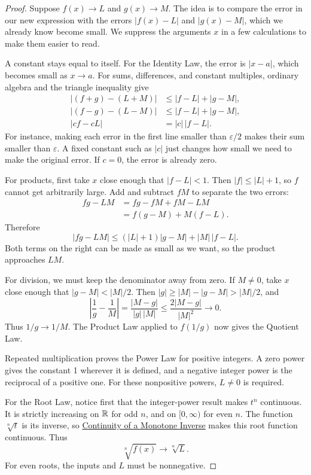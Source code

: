 \begin{proof}
Suppose $f(x)\to L$ and $g(x)\to M$. The idea is to compare the error in
our new expression with the errors $|f(x)-L|$ and $|g(x)-M|$, which we
already know become small. We suppress the arguments $x$ in a few
calculations to make them easier to read.

A constant stays equal to itself. For the Identity Law, the error is
$|x-a|$, which becomes small as $x\to a$. For sums, differences, and
constant multiples, ordinary algebra and the triangle inequality give
\begin{align*}
|(f+g)-(L+M)|&\leq |f-L|+|g-M|,\\
|(f-g)-(L-M)|&\leq |f-L|+|g-M|,\\
|cf-cL|&=|c|\,|f-L|.
\end{align*}
For instance, making each error in the first line smaller than
$\varepsilon/2$ makes their sum smaller than $\varepsilon$.
A fixed constant such as $|c|$ just changes how small we need to make
the original error. If $c=0$, the error is already zero.

For products, first take $x$ close enough that $|f-L|<1$.
Then $|f|\leq |L|+1$, so $f$ cannot get arbitrarily large.
Add and subtract $fM$ to separate the two errors:
\begin{align*}
fg-LM&=fg-fM+fM-LM\\
&=f(g-M)+M(f-L).
\end{align*}
Therefore
$$|fg-LM|\leq (|L|+1)|g-M|+|M|\,|f-L|.$$
Both terms on the right can be made as small as we want, so the
product approaches $LM$.

For division, we must keep the denominator away from zero.
If $M\ne0$, take $x$ close enough that $|g-M|<|M|/2$. Then
$|g|\geq |M|-|g-M|>|M|/2$, and
$$
\left|\frac1g-\frac1M\right|
=\frac{|M-g|}{|g|\,|M|}
\leq\frac{2|M-g|}{|M|^2}\longrightarrow0.
$$
Thus $1/g\to1/M$. The Product Law applied to $f(1/g)$ now gives the
Quotient Law.

Repeated multiplication proves the Power Law for positive integers.
A zero power gives the constant 1 wherever it is defined, and a
negative integer power is the reciprocal of a positive one. For these
nonpositive powers, $L\ne0$ is required.

For the Root Law, notice first that the integer-power result makes
$t^n$ continuous. It is strictly increasing on $\mathbb{R}$ for odd $n$, and
on $[0,\infty)$ for even $n$. The function $\sqrt[n]{t}$ is its inverse,
so \hyperref[sec:inverse-continuity-proof]{Continuity of a Monotone Inverse}
makes this root function continuous. Thus
$$\sqrt[n]{f(x)}\longrightarrow\sqrt[n]{L}.$$
For even roots, the inputs and $L$ must be nonnegative.


\end{proof}
